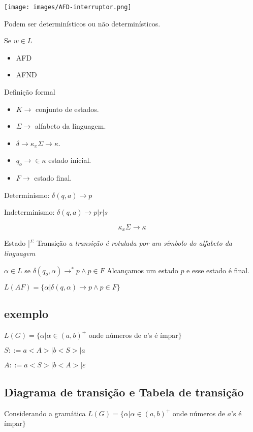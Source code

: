 \documentclass[]{article}
\begin{document}
		\texttt{[image: images/AFD-interruptor.png]}		
		
		Podem ser determinísticos ou não determinísticos.
		
		Se $w \in L$
		\begin{itemize}
			\item AFD
			\item AFND
		\end{itemize}
		
		Definição formal		
		\begin{itemize}
			\item $K \to$ conjunto de estados.
			\item $\Sigma \to$ alfabeto da linguagem.
			\item $\delta \to \kappa _x \Sigma \to \kappa$.
			\item $q_o \to \in \kappa$ estado inicial.
			\item $F \to $ estado final.
		\end{itemize}
		
		Determinismo: $\delta(q,a) \to p$
		
		Indeterminismo: $\delta(q,a) \to p | r | s$
		
		$$\kappa _x \Sigma \to \kappa$$
		
		Estado |$^\Sigma$ Transição \textit{a transição é rotulada por um símbolo do alfabeto da linguagem}
		
		$\alpha \in L$ se $\delta (q_o, \alpha) \to^* p \wedge p \in F$ Alcançamos um estado $p$ e esse estado é final.
		
		$L(AF) = \{ \alpha | \delta(q,\alpha) \to p \wedge p \in F\}$
		\subsection{exemplo}		
		$L(G) =\{ \alpha | \alpha \in (a,b)^+$ onde números de $a$'s é ímpar$\}$
		
		$S::= a<A> | b<S> | a$ %
		
		$A::= a<S> | b<A> |\varepsilon$
		
		\subsection{Diagrama de transição e Tabela de transição}
		Considerando a gramática $L(G) =\{ \alpha | \alpha \in (a,b)^+$ onde números de $a$'s é ímpar$\}$
		
\end{document}
